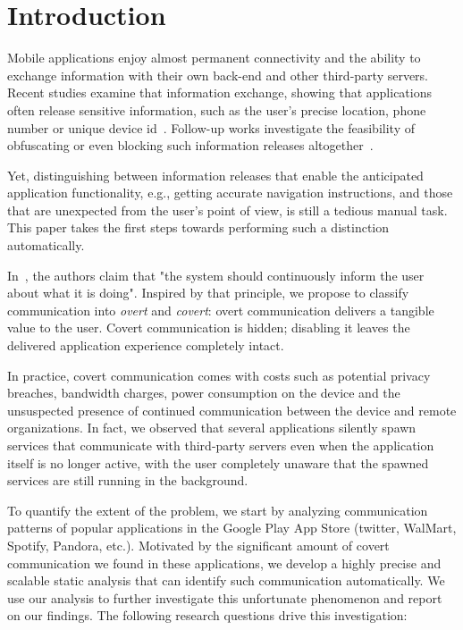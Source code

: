 \vspace{-0.05in}
\section{Introduction}
\label{sec:intro} 
Mobile applications enjoy almost permanent connectivity and the
ability to exchange information with their own back-end and other
third-party servers. 
Recent studies examine that information exchange, showing that applications often release sensitive information, such as the user's precise location, phone number or unique device id~\cite{Enck:Gilbert:Chun:Cox:Jung:McDaniel:Sheth:OSDI10, Egele:Kruegel:Kirda:Vign:NDSS11,Tripp:Rubin:SEC14,Gordon:Kim:Perkins:Gilham:Nguyen:Rinard:NDSS15}. 
Follow-up works investigate the feasibility of obfuscating or even blocking such information releases altogether~\cite{Hornyack:Han:Jung:Schechter:Wetherall:CCS11}.

Yet, distinguishing between information releases that enable the anticipated application functionality, e.g., getting accurate navigation instructions, and those that are unexpected from the user's point of view, is still a tedious manual task. This paper takes the first steps towards performing such a distinction 
automatically.

In~\cite{Nielsen:Molich:CHI90,Blackmon:Polson:Kitajima:Lewis:CHI02}, the authors claim that  
"the system should continuously inform the user about what it is doing". 
Inspired by that principle, we propose to classify communication into 
\emph{overt} and \emph{covert}: 
overt communication delivers a tangible value to the user.
Covert communication is hidden; disabling it leaves the delivered application experience completely intact.   

  
In practice, covert communication comes with costs such as  
potential privacy breaches, bandwidth charges, power consumption on the device  
and the unsuspected presence of continued
communication between the device and remote organizations. 
In fact, we
observed that several applications silently spawn services that
communicate with third-party servers even when the application itself
is no longer active, with the user completely unaware that the spawned
services are still running in the background. 

To quantify the extent of the problem,  
we start by
analyzing communication patterns of
popular applications in the Google Play App Store (twitter, WalMart,
Spotify, Pandora, etc.). Motivated by the significant
amount of covert communication we found in these applications, 
we develop a highly precise and scalable static analysis that can identify 
such communication automatically. We use our analysis to further 
investigate this unfortunate phenomenon and report on our findings. 
The following research questions drive this investigation:


